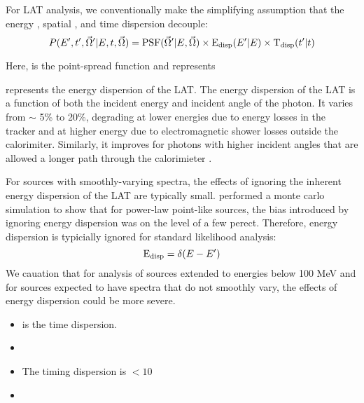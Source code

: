 For LAT analysis, we conventionally make the simplifying assumption that
the energy , spatial , and time dispersion decouple:
\begin{equation}
  P(E',t',\vec\Omega'|E,t,\vec\Omega) = 
  \text{PSF}(\vec\Omega'|E,\vec\Omega) \times \text{E}_\text{disp}(E'|E) \times \text{T}_\text{disp}(t'|t)
\end{equation}

Here, \psf is the point-spread function and represents 

\edisp represents the energy dispersion of the LAT.
The energy dispersion of the LAT is a function of both the
incident energy and incident angle of the photon. It varies
from $\sim$ 5\% to 20\%, degrading at lower energies due to energy
losses in the tracker and at higher energy due to electromagnetic
shower losses outside the calorimiter. Similarly, it improves
for photons with higher incident angles that are 
allowed a longer path through the calorimieter \citep{lat_calibration_2012}.

For sources with smoothly-varying spectra, the effects of ignoring
the inherent energy dispersion of the LAT are typically small.
\cite{lat_calibration_2012} performed a monte carlo simulation to show
that for power-law point-like sources, the bias introduced by ignoring
energy dispersion was on the level of a few perect.  Therefore, energy
dispersion is typicially ignored for standard likelihood analysis:
\begin{equation}
\text{E}_\text{disp} = \delta(E-E')
\end{equation}
We cauation that for analysis of sources extended to energies below 100
MeV and for sources expected to have spectra that do not smoothly vary,
the effects of energy dispersion could be more severe.

\begin{itemize}
  \item \tdisp is the time dispersion. 
  \item {}
  \item The timing dispersion is $<10$ \microsecond\cite{lat_mission_atwood_2009}
\item {}
\end{itemize}

